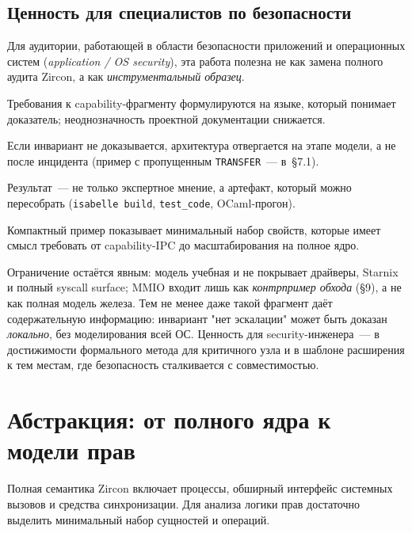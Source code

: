 \documentclass[11pt,a4paper]{article}
\begin{document}
\subsection{Ценность для специалистов по безопасности}

Для аудитории, работающей в области безопасности приложений и
операционных систем (\emph{application / OS security}), эта работа
полезна не как замена полного аудита Zircon, а как
\emph{инструментальный образец}.
\begin{description}[style=nextline,leftmargin=1.2em]
	\item[Язык спецификации]
	      Требования к \textenglish{capability}-фрагменту формулируются на языке, который
	      понимает доказатель; неоднозначность проектной документации
	      снижается.
	\item[Раннее обнаружение дефектов]
	      Если инвариант не доказывается, архитектура отвергается на этапе
	      модели, а не после инцидента (пример с пропущенным
	      \texttt{TRANSFER}~--- в~§7.1).
	\item[Перепроверяемые гарантии]
	      Результат~--- не только экспертное мнение, а артефакт, который можно
	      пересобрать (\texttt{isabelle build}, \texttt{test\_code}, OCaml-прогон).
	\item[Обучение и практики]
	      Компактный пример показывает минимальный набор свойств, которые
	      имеет смысл требовать от \textenglish{capability}-IPC до масштабирования на полное
	      ядро.
\end{description}
Ограничение остаётся явным: модель учебная и не покрывает драйверы,
Starnix и полный syscall surface; MMIO входит лишь как
\emph{контрпример обхода} (§9), а не как полная модель железа.
Тем не менее даже такой фрагмент
даёт содержательную информацию: инвариант "нет эскалации" может быть
доказан \emph{локально}, без моделирования всей ОС. Ценность для
security-инженера~--- в достижимости формального метода для критичного
узла и в шаблоне расширения к тем местам, где безопасность сталкивается
с совместимостью.

\section{Абстракция: от полного ядра к модели прав}

Полная семантика Zircon включает процессы, обширный интерфейс системных
вызовов и средства синхронизации. Для анализа логики прав достаточно
выделить минимальный набор сущностей и операций.
\end{document}
